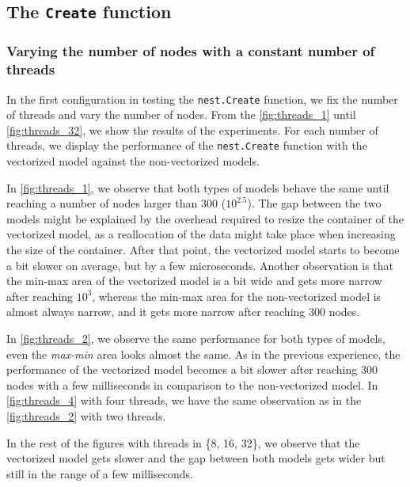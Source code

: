 \subsection{The \texttt{Create} function}

\subsubsection{Varying the number of nodes with a constant number of threads}

 In the first configuration in testing the \texttt{nest.Create} function, we fix the number of threads and vary the number of nodes. From the  \autoref{fig:threads_1} until \autoref{fig:threads_32}, we show the results of the experiments. For each number of threads, we display the performance of the \texttt{nest.Create} function with the vectorized model against the non-vectorized models. 


In \autoref{fig:threads_1}, we observe that both types of models behave the same until reaching a number of nodes larger than 300 ($10^{2.5}$). The gap between the two models might be explained by the overhead required to resize the container of the vectorized model, as a reallocation of the data might take place when increasing the size of the container. After that point, the vectorized model starts to become a bit slower on average, but by a few microseconds. Another observation is that the min-max area of the vectorized model is a bit wide and gets more narrow after reaching $10^3$, whereas the min-max area for the non-vectorized model is almost always narrow, and it gets more narrow after reaching 300 nodes.

In \autoref{fig:threads_2}, we observe the same performance for both types of models, even the \emph{max-min} area looks almost the same. As in the previous experience, the performance of the vectorized model becomes a bit slower after reaching 300 nodes with a few milliseconds in comparison to the non-vectorized model. In \autoref{fig:threads_4} with four threads, we have the same observation as in the \autoref{fig:threads_2} with two threads.

In the rest of the figures with threads in \{8, 16, 32\}, we observe that the vectorized model gets slower and the gap between both models gets wider but still in the range of a few milliseconds.

